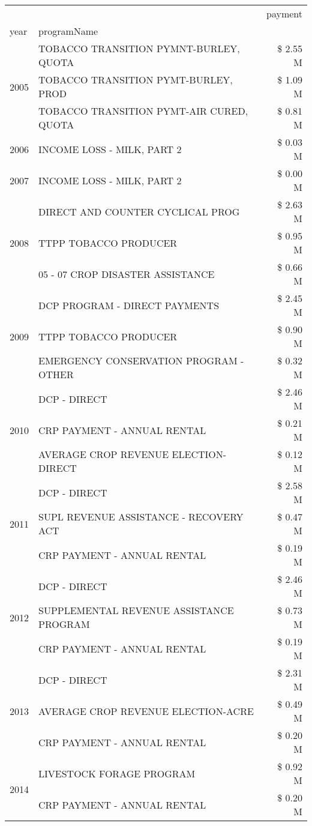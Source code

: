 \begin{tabular}{llr}
\toprule
 &  & payment \\
year & programName &  \\
\midrule
\multirow[t]{3}{*}{2005} & TOBACCO TRANSITION PYMNT-BURLEY, QUOTA & \$ 2.55 M \\
 & TOBACCO TRANSITION PYMT-BURLEY, PROD & \$ 1.09 M \\
 & TOBACCO TRANSITION PYMT-AIR CURED, QUOTA & \$ 0.81 M \\
\cline{1-3}
2006 & INCOME LOSS - MILK, PART 2 & \$ 0.03 M \\
\cline{1-3}
2007 & INCOME LOSS - MILK, PART 2 & \$ 0.00 M \\
\cline{1-3}
\multirow[t]{3}{*}{2008} & DIRECT AND COUNTER CYCLICAL PROG & \$ 2.63 M \\
 & TTPP TOBACCO PRODUCER & \$ 0.95 M \\
 & 05 - 07 CROP DISASTER ASSISTANCE & \$ 0.66 M \\
\cline{1-3}
\multirow[t]{3}{*}{2009} & DCP PROGRAM - DIRECT PAYMENTS & \$ 2.45 M \\
 & TTPP TOBACCO PRODUCER & \$ 0.90 M \\
 & EMERGENCY CONSERVATION PROGRAM - OTHER & \$ 0.32 M \\
\cline{1-3}
\multirow[t]{3}{*}{2010} & DCP - DIRECT & \$ 2.46 M \\
 & CRP PAYMENT - ANNUAL RENTAL & \$ 0.21 M \\
 & AVERAGE CROP REVENUE ELECTION-DIRECT & \$ 0.12 M \\
\cline{1-3}
\multirow[t]{3}{*}{2011} & DCP - DIRECT & \$ 2.58 M \\
 & SUPL REVENUE ASSISTANCE - RECOVERY ACT & \$ 0.47 M \\
 & CRP PAYMENT - ANNUAL RENTAL & \$ 0.19 M \\
\cline{1-3}
\multirow[t]{3}{*}{2012} & DCP - DIRECT & \$ 2.46 M \\
 & SUPPLEMENTAL REVENUE ASSISTANCE PROGRAM & \$ 0.73 M \\
 & CRP PAYMENT - ANNUAL RENTAL & \$ 0.19 M \\
\cline{1-3}
\multirow[t]{3}{*}{2013} & DCP - DIRECT & \$ 2.31 M \\
 & AVERAGE CROP REVENUE ELECTION-ACRE & \$ 0.49 M \\
 & CRP PAYMENT - ANNUAL RENTAL & \$ 0.20 M \\
\cline{1-3}
\multirow[t]{3}{*}{2014} & LIVESTOCK FORAGE PROGRAM & \$ 0.92 M \\
 & CRP PAYMENT - ANNUAL RENTAL & \$ 0.20 M \\

\end{tabular}
